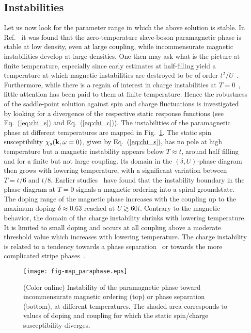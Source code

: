 \documentclass[showpacs,amsmath,twocolumn,floatfix]{revtex4-1}
\begin{document}
\subsection{Instabilities}



Let us now look for the parameter range in which the above solution is stable. 
In Ref.~\cite{doll93} it was found that the zero-temperature slave-boson 
paramagnetic phase is stable at low density, even at large coupling, while  
incommensurate magnetic instabilities develop at large densities. One then may 
ask what is the picture at finite temperature, especially since early estimates 
at half-filling yield a temperature at which magnetic instabilities are destroyed 
to be of order $t^2/U$~\cite{Doll3}. Furthermore, while there is a regain 
of interest in charge instabilities at $T=0$~\cite{lhoutellier15,Ste17}, little 
attention has been paid to them at finite temperature. 
Hence the robustness of the saddle-point solution against spin and charge 
fluctuations is investigated by looking for a divergence of the 
respective static response functions (see Eq.~(\ref{eq:chi_s}) and 
Eq.~(\ref{eq:chi_c})). 
The instabilities of the paramagnetic phase at 
different temperatures are mapped in Fig.~\ref{fig:phasediagram}. The 
static spin susceptibility $\chi_s({\bf k},\omega=0)$, given by 
Eq.~(\ref{eq:chi_s}), has no pole at high temperature but a magnetic 
instability appears below $T \approx t$, around half filling 
and for a finite but not large coupling. Its domain in the 
$(\delta,U)$-phase diagram then grows with lowering temperature, with 
a significant variation between $T=t/6$ and $t/8$. Earlier 
studies~\cite{Fre92,doll93} have found that the instability boundary 
in the phase diagram at $T=0$ signals a magnetic ordering into a spiral 
groundstate. The doping range of the magnetic phase increases with the 
coupling up to the maximum doping $\delta \approx 0.63$ reached at 
$U\gtrsim 60 t$. Contrary to the magnetic behavior, the domain of the 
charge instability shrinks with lowering temperature. It is limited to 
small doping and occurs at all coupling above a moderate threshold 
value which increases with lowering temperature. The charge instability 
is related to a tendency towards a phase separation~\cite{Fre92} or 
towards the more complicated stripe phases~\cite{SeiSi,Sei02,Rac06}. 

\begin{figure}[h!]
	 \texttt{[image: fig-map\_paraphase.eps]}
	\caption{(Color online) Instability of the paramagnetic phase toward 
	incommensurate magnetic ordering (top) or phase separation (bottom), 
	at different temperatures. 
	The shaded area corresponds to values of doping and coupling for which 
	the static spin/charge susceptibility diverges.}
	\label{fig:phasediagram}
\end{figure}
\end{document}
